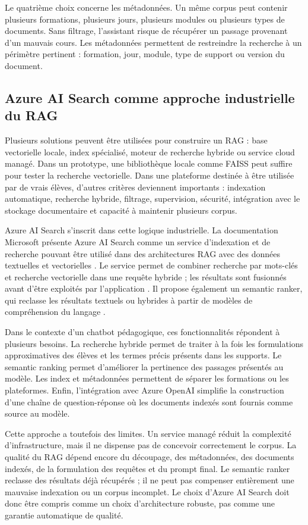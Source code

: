 \documentclass[12pt,a4paper]{article}
\begin{document}
Le quatrième choix concerne les métadonnées. Un même corpus peut contenir plusieurs
formations, plusieurs jours, plusieurs modules ou plusieurs types de documents. Sans
filtrage, l'assistant risque de récupérer un passage provenant d'un mauvais cours. Les
métadonnées permettent de restreindre la recherche à un périmètre pertinent : formation,
jour, module, type de support ou version du document.

\subsection{Azure AI Search comme approche industrielle du RAG}

Plusieurs solutions peuvent être utilisées pour construire un RAG : base vectorielle locale,
index spécialisé, moteur de recherche hybride ou service cloud managé. Dans un prototype,
une bibliothèque locale comme FAISS peut suffire pour tester la recherche vectorielle.
Dans une plateforme destinée à être utilisée par de vrais élèves, d'autres critères
deviennent importants : indexation automatique, recherche hybride, filtrage, supervision,
sécurité, intégration avec le stockage documentaire et capacité à maintenir plusieurs
corpus.

Azure AI Search s'inscrit dans cette logique industrielle. La documentation Microsoft
présente Azure AI Search comme un service d'indexation et de recherche pouvant être
utilisé dans des architectures RAG avec des données textuelles et vectorielles
\cite{microsoft2026foundryrag}. Le service permet de combiner recherche par mots-clés
et recherche vectorielle dans une requête hybride ; les résultats sont fusionnés avant
d'être exploités par l'application \cite{microsoft2026hybridsearch}. Il propose également
un semantic ranker, qui reclasse les résultats textuels ou hybrides à partir de modèles de
compréhension du langage \cite{microsoft2026semanticranker}.

Dans le contexte d'un chatbot pédagogique, ces fonctionnalités répondent à plusieurs
besoins. La recherche hybride permet de traiter à la fois les formulations approximatives
des élèves et les termes précis présents dans les supports. Le semantic ranking permet
d'améliorer la pertinence des passages présentés au modèle. Les index et métadonnées
permettent de séparer les formations ou les plateformes. Enfin, l'intégration avec Azure
OpenAI simplifie la construction d'une chaîne de question-réponse où les documents
indexés sont fournis comme source au modèle.

Cette approche a toutefois des limites. Un service managé réduit la complexité
d'infrastructure, mais il ne dispense pas de concevoir correctement le corpus. La qualité
du RAG dépend encore du découpage, des métadonnées, des documents indexés, de la
formulation des requêtes et du prompt final. Le semantic ranker reclasse des résultats
déjà récupérés ; il ne peut pas compenser entièrement une mauvaise indexation ou un
corpus incomplet. Le choix d'Azure AI Search doit donc être compris comme un choix
d'architecture robuste, pas comme une garantie automatique de qualité.
\end{document}
